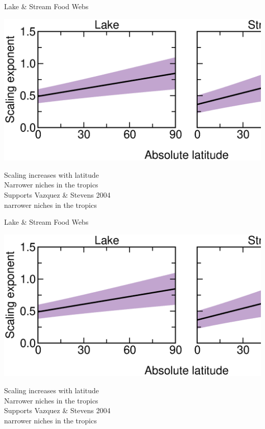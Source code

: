 \documentclass{beamer}
\begin{document}
  \begin{frame}{Lake \& Stream Food Webs}
    \begin{center}
      \includegraphics*[width=.8\textwidth]{Figures/results/effect.eps}

      \vspace{1cm}
      Scaling increases with latitude\\
      {\color{white} Narrower niches in the tropics\\
      Supports Vazquez \& Stevens 2004\\}
      {\color{white} narrower niches in the tropics}

    \end{center}
  \end{frame}


  \begin{frame}{Lake \& Stream Food Webs}
    \begin{center}
      \includegraphics*[width=.8\textwidth]{Figures/results/effect.eps}

      \vspace{1cm}
      Scaling increases with latitude\\
      Narrower niches in the tropics\\
      {\color{white} Supports Vazquez \& Stevens 2004\\}
      {\color{white} narrower niches in the tropics}

    \end{center}
  \end{frame}
\end{document}
